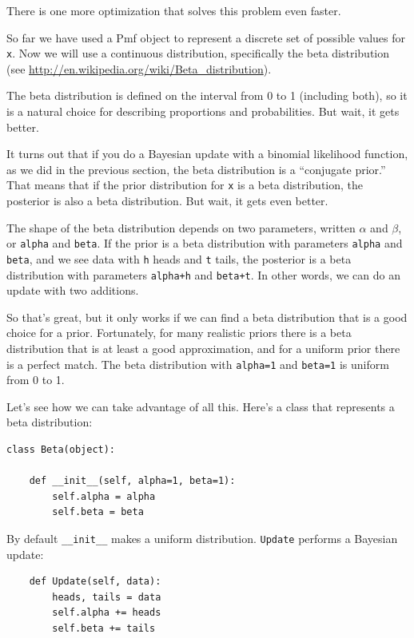 \documentclass[12pt]{book}
\begin{document}
There is one more optimization that solves this problem
even faster.

So far we have used a Pmf object to represent a discrete set of
possible values for {\tt x}.  Now we will use a continuous
distribution, specifically the beta distribution (see
\url{http://en.wikipedia.org/wiki/Beta_distribution}).

The beta distribution is defined on the interval from 0 to 1
(including both), so it is a natural choice for describing
proportions and probabilities.  But wait, it gets better.

It turns out that if you do a Bayesian update with a binomial
likelihood function, as we did in the previous section, the beta
distribution is a ``conjugate prior.''  That means that if the prior
distribution for {\tt x} is a beta distribution, the posterior is also
a beta distribution.  But wait, it gets even better.

The shape of the beta distribution depends on two parameters, written
$\alpha$ and $\beta$, or {\tt alpha} and {\tt beta}.  If the prior
is a beta distribution with parameters {\tt alpha} and {\tt beta}, and
we see data with {\tt h} heads and {\tt t} tails, the posterior is a
beta distribution with parameters {\tt alpha+h} and {\tt beta+t}.  In
other words, we can do an update with two additions.

So that's great, but it only works if we can find a beta distribution
that is a good choice for a prior.  Fortunately, for many realistic
priors there is a beta distribution that is at least a good
approximation, and for a uniform prior there is a perfect match.  The
beta distribution with {\tt alpha=1} and {\tt beta=1} is uniform from
0 to 1.

Let's see how we can take advantage of all this.  Here's
a class that represents a beta distribution:

\begin{verbatim}
class Beta(object):

    def __init__(self, alpha=1, beta=1):
        self.alpha = alpha
        self.beta = beta
\end{verbatim}

By default \verb"__init__" makes a uniform distribution.
{\tt Update} performs a Bayesian update:

\begin{verbatim}
    def Update(self, data):
        heads, tails = data
        self.alpha += heads
        self.beta += tails
\end{verbatim}
\end{document}
